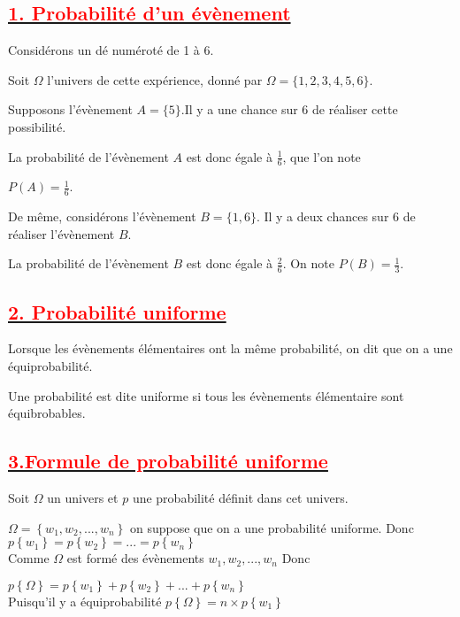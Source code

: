 \documentclass[12pt]{article}
\begin{document}
\subsection*{\underline{\textbf{\textcolor{red}{1. Probabilité d'un évènement}}}}

Considérons un dé numéroté de 1 à 6.

Soit $\Omega$ l'univers de cette expérience, donné par $\Omega=\{1, 2, 3, 4, 5, 6\}$.

Supposons l'évènement $A=\{5\}$.Il y a une chance sur 6 de réaliser cette possibilité.

La probabilité de l'évènement $A$ est donc égale à $\frac{1}{6}$, que l'on note

 $P(A)=\frac{1}{6}$.

De même, considérons l'évènement $B=\{1, 6\}$. Il y a deux chances sur 6 de réaliser l'évènement $B$.

La probabilité de l'évènement $B$ est donc égale à $\frac{2}{6}$. On note $P(B)=\frac{1}{3}$.
\subsection*{\underline{\textbf{\textcolor{red}{2. Probabilité uniforme}}}}
Lorsque les évènements élémentaires ont la même probabilité, on dit que on a une équiprobabilité.

Une probabilité est dite uniforme si tous les évènements élémentaire sont équibrobables.\\
\subsection*{\underline{\textbf{\textcolor{red}{3.Formule de probabilité uniforme}}}}
Soit $\Omega$ un univers et $p$ une probabilité définit dans cet univers.

$\Omega=\left\lbrace w_{1}, w_{2},...,w_{n}\right\rbrace $ on suppose que on a une probabilité uniforme.
Donc $p\left\lbrace w_{1} \right\rbrace =p\left\lbrace w_{2} \right\rbrace =...
=p\left\lbrace w_{n} \right\rbrace$\\
Comme $\Omega$ est formé des évènements $w_{1}, w_{2},...,w_{n}$ Donc


$p\left\lbrace \Omega\right\rbrace =p\left\lbrace w_{1} \right\rbrace +p\left\lbrace w_{2} \right\rbrace +...+p\left\lbrace w_{n} \right\rbrace$\\
Puisqu'il y a équiprobabilité 
$p\left\lbrace \Omega\right\rbrace =n\times p\left\lbrace w_{1} \right\rbrace$
\end{document}
